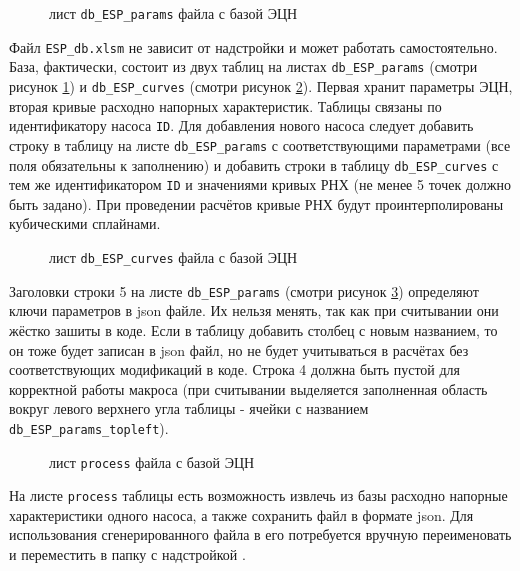 \begin{figure}[H]
	\caption{лист \texttt{db_ESP_params} файла с базой ЭЦН}
	\label{ris:ESP_db_1}
\end{figure}

Файл \texttt{ESP_db.xlsm} не зависит от надстройки \unf{} и может работать самостоятельно. База, фактически, состоит из двух таблиц на листах \texttt{db_ESP_params} (смотри рисунок \ref{ris:ESP_db_1})  и \texttt{db_ESP_curves} (смотри  рисунок \ref{ris:ESP_db_2}). Первая хранит параметры ЭЦН, вторая кривые расходно напорных характеристик. Таблицы связаны по идентификатору насоса \texttt{ID}. Для добавления нового насоса следует добавить строку в таблицу на листе \texttt{db_ESP_params} с соответствующими параметрами (все поля обязательны к заполнению) и добавить строки в таблицу \texttt{db_ESP_curves} с тем же идентификатором \texttt{ID} и значениями кривых РНХ (не менее 5 точек должно быть задано). При проведении расчётов кривые РНХ будут проинтерполированы кубическими сплайнами.  

\begin{figure}[H]
	\caption{лист \texttt{db_ESP_curves} файла с базой ЭЦН}
	\label{ris:ESP_db_2}
\end{figure}

Заголовки строки 5 на листе \texttt{db_ESP_params} (смотри  рисунок \ref{ris:ESP_db_3}) определяют ключи параметров в json файле. Их нельзя менять, так как при считывании они жёстко зашиты в коде. Если в таблицу добавить столбец с новым названием, то он тоже будет записан в json файл, но не будет учитываться в расчётах без соответствующих модификаций в коде. Строка 4 должна быть пустой для корректной работы макроса (при считывании выделяется заполненная область вокруг левого верхнего угла таблицы - ячейки с названием \texttt{db_ESP_params_topleft}).

\begin{figure}[H]
	\caption{лист \texttt{process} файла с базой ЭЦН}
	\label{ris:ESP_db_3}
\end{figure}

На листе \texttt{process} таблицы есть возможность извлечь из базы расходно напорные характеристики одного насоса, а также сохранить файл в формате json. Для использования сгенерированного файла в \unf{} его потребуется вручную переименовать и переместить в папку с надстройкой \unf{}. 



